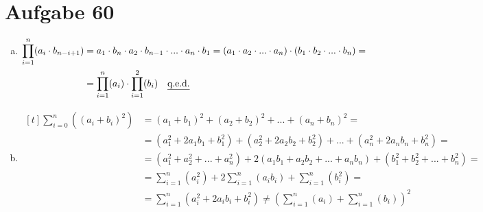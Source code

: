 \documentclass[10pt, oneside]{article}
\begin{document}
\section{Aufgabe 60}
\begin{enumerate}[(a)]
    \item $\begin{aligned}[t]
            \prod_{i = 1}^{n} (a_i \cdot b_{n - i + 1}) &= a_1 \cdot b_{n} \cdot a_2 \cdot b_{n - 1} \cdot ... \cdot a_{n} \cdot b_{1} = (a_1 \cdot a_2 \cdot ... \cdot a_n) \cdot (b_1 \cdot b_2 \cdot ... \cdot b_n) = \\
                                                        &= \prod_{i = 1}^n(a_i) \cdot \prod_{i = 1}^2(b_i) \quad \text{\underline{q.e.d.}}
        \end{aligned}$
    \item $\begin{aligned}[t]
            \sum_{i = 0}^n((a_i + b_i)^2) &= (a_1 + b_1)^2 + (a_2 + b_2)^2 + ... + (a_n + b_n)^2 = \\
                                          &= (a_1^2 + 2a_1b_1 + b_1^2) + (a_2^2 + 2a_2b_2 + b_2^2) + ... + (a_n^2 + 2a_nb_n + b_n^2) = \\[5pt]
                                          &= (a_1^2 + a_2^2 + ... + a_n^2) + 2(a_1b_1 + a_2b_2 + ... + a_nb_n) + (b_1^2 + b_2^2 + ... + b_n^2) = \\[5pt]
                                          &= \sum_{i = 1}^n(a_i^2) + 2\sum_{i = 1}^n(a_ib_i) + \sum_{i = 1}^n(b_i^2) = \\[5pt]
                                          &= \sum_{i = 1}^n(a_i^2 + 2a_ib_i + b_i^2) \neq (\sum_{i = 1}^n(a_i) + \sum_{i = 1}^n(b_i))^2
        \end{aligned}$
\end{enumerate}
\end{document}
